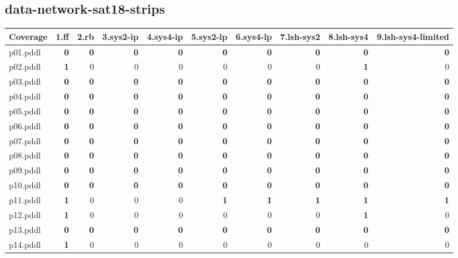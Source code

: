 \documentclass{article}
\begin{document}
\hypertarget{coverage-data-network-sat18-strips}{}
\subsection*{data-network-sat18-strips}

\begin{tabular}{@{}lrrrrrrrrr@{}}
Coverage & 1.ff & 2.rb & 3.sys2-ip & 4.sys4-ip & 5.sys2-lp & 6.sys4-lp & 7.lsh-sys2 & 8.lsh-sys4 & 9.lsh-sys4-limited \\
\midrule
p01.pddl & \textbf{0} & \textbf{0} & \textbf{0} & \textbf{0} & \textbf{0} & \textbf{0} & \textbf{0} & \textbf{0} & \textbf{0} \\
p02.pddl & \textbf{1} & 0 & 0 & 0 & 0 & 0 & 0 & \textbf{1} & 0 \\
p03.pddl & \textbf{0} & \textbf{0} & \textbf{0} & \textbf{0} & \textbf{0} & \textbf{0} & \textbf{0} & \textbf{0} & \textbf{0} \\
p04.pddl & \textbf{0} & \textbf{0} & \textbf{0} & \textbf{0} & \textbf{0} & \textbf{0} & \textbf{0} & \textbf{0} & \textbf{0} \\
p05.pddl & \textbf{0} & \textbf{0} & \textbf{0} & \textbf{0} & \textbf{0} & \textbf{0} & \textbf{0} & \textbf{0} & \textbf{0} \\
p06.pddl & \textbf{0} & \textbf{0} & \textbf{0} & \textbf{0} & \textbf{0} & \textbf{0} & \textbf{0} & \textbf{0} & \textbf{0} \\
p07.pddl & \textbf{0} & \textbf{0} & \textbf{0} & \textbf{0} & \textbf{0} & \textbf{0} & \textbf{0} & \textbf{0} & \textbf{0} \\
p08.pddl & \textbf{0} & \textbf{0} & \textbf{0} & \textbf{0} & \textbf{0} & \textbf{0} & \textbf{0} & \textbf{0} & \textbf{0} \\
p09.pddl & \textbf{0} & \textbf{0} & \textbf{0} & \textbf{0} & \textbf{0} & \textbf{0} & \textbf{0} & \textbf{0} & \textbf{0} \\
p10.pddl & \textbf{0} & \textbf{0} & \textbf{0} & \textbf{0} & \textbf{0} & \textbf{0} & \textbf{0} & \textbf{0} & \textbf{0} \\
p11.pddl & \textbf{1} & 0 & 0 & 0 & \textbf{1} & \textbf{1} & \textbf{1} & \textbf{1} & \textbf{1} \\
p12.pddl & \textbf{1} & 0 & 0 & 0 & 0 & 0 & 0 & \textbf{1} & 0 \\
p13.pddl & \textbf{0} & \textbf{0} & \textbf{0} & \textbf{0} & \textbf{0} & \textbf{0} & \textbf{0} & \textbf{0} & \textbf{0} \\
p14.pddl & \textbf{1} & 0 & 0 & 0 & 0 & 0 & 0 & 0 & 0 \\

\end{tabular}
\end{document}
